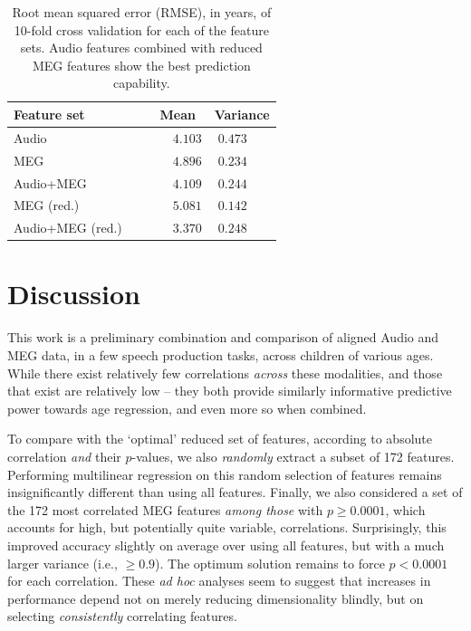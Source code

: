 \documentclass[a4paper]{article}
\begin{document}
\begin{table}[t]
  \caption{Root mean squared error (RMSE), in years, of 10-fold cross validation for each of the feature sets. Audio features combined with reduced MEG features show the best prediction capability.}
  \label{tab:rmse}
  \centering
  \begin{tabular}{ l@{}c  c }
    \toprule
    \multicolumn{1}{l}{\textbf{Feature set}} & \multicolumn{1}{c}{\textbf{Mean}} & \multicolumn{1}{c}{\textbf{Variance}} \\
    \midrule
    Audio~~~                             & ~~~$4.103$         &     $0.473$~~~       \\
    MEG~~~                               & ~~~$4.896$         &     $0.234$~~~       \\
    Audio+MEG~~~                         & ~~~$4.109$         &     $0.244$~~~       \\

    MEG (red.)~~~                        & ~~~$5.081$         &     $0.142$~~~       \\
    Audio+MEG (red.)~~~                  & ~~~$3.370$         &     $0.248$~~~       \\
    \bottomrule
  \end{tabular}
\end{table}

\section{Discussion}

This work is a preliminary combination and comparison of aligned Audio and MEG data, in a few speech production tasks, across children of various ages. While there exist relatively few correlations {\em across} these modalities, and those that exist are relatively low -- they both provide similarly informative predictive power towards age regression, and even more so when combined.

To compare with the `optimal' reduced set of features, according to absolute correlation {\em and} their $p$-values, we also {\em randomly} extract a subset of 172 features. Performing multilinear regression on this random selection of features remains insignificantly different than using all features. Finally, we also considered a set of the 172 most correlated MEG features {\em among those} with $p \geq 0.0001$, which accounts for high, but potentially quite variable, correlations. Surprisingly, this improved accuracy slightly on average over using all features, but with a much larger variance (i.e., $\geq 0.9$). The optimum solution remains to force $p<0.0001$ for each correlation. These {\em ad hoc} analyses seem to suggest that increases in performance depend not on merely reducing dimensionality blindly, but on selecting {\em consistently} correlating features.
\end{document}
